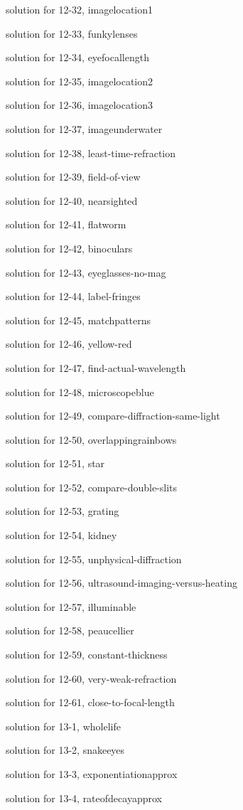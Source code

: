 \documentclass{problems}
\begin{document}
solution for 12-32, imagelocation1

solution for 12-33, funkylenses

solution for 12-34, eyefocallength

solution for 12-35, imagelocation2

solution for 12-36, imagelocation3

solution for 12-37, imageunderwater

solution for 12-38, least-time-refraction

solution for 12-39, field-of-view

solution for 12-40, nearsighted

solution for 12-41, flatworm

solution for 12-42, binoculars

solution for 12-43, eyeglasses-no-mag

solution for 12-44, label-fringes

solution for 12-45, matchpatterns

solution for 12-46, yellow-red

solution for 12-47, find-actual-wavelength

solution for 12-48, microscopeblue

solution for 12-49, compare-diffraction-same-light

solution for 12-50, overlappingrainbows

solution for 12-51, star

solution for 12-52, compare-double-slits

solution for 12-53, grating

solution for 12-54, kidney

solution for 12-55, unphysical-diffraction

solution for 12-56, ultrasound-imaging-versus-heating

solution for 12-57, illuminable

solution for 12-58, peaucellier

solution for 12-59, constant-thickness

solution for 12-60, very-weak-refraction

solution for 12-61, close-to-focal-length

solution for 13-1, wholelife

solution for 13-2, snakeeyes

solution for 13-3, exponentiationapprox

solution for 13-4, rateofdecayapprox
\end{document}
